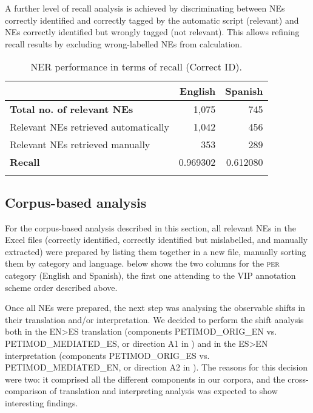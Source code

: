 \documentclass[output=paper]{langscibook}
\begin{document}
A further level of recall analysis is achieved by discriminating between NEs correctly identified and correctly tagged by the automatic script (relevant) and NEs correctly identified but wrongly tagged (not relevant). This allows refining recall results by excluding wrong-labelled NEs from calculation. 

\begin{table}
\begin{tabularx}{\textwidth}{Xrr} 
\lsptoprule
& {\bfseries English} & {\bfseries Spanish}\\
\midrule
{\bfseries Total no. of relevant NEs} & 1,075 & 745\\
Relevant NEs retrieved automatically & 1,042 & 456\\
Relevant NEs retrieved manually & 353 & 289\\
{\bfseries Recall} & 0.969302 & 0.612080\\
\lspbottomrule
\end{tabularx}
\caption{
NER performance in terms of recall (Correct ID).
}
\label{tab:corpas:7}
\end{table}


\subsection{Corpus-based analysis}\label{sec:corpas:4.3}

For the corpus-based analysis described in this section, all relevant NEs in the Excel files (correctly identified, correctly identified but mislabelled, and manually extracted) were prepared by listing them together in a new file, manually sorting them by category and language.   below shows the two columns for the \textsc{per} category (English and Spanish), the first one attending to the VIP annotation scheme order described above.

Once all NEs were prepared, the next step was analysing the observable shifts in their translation and/or interpretation. We decided to perform the shift analysis both in the EN>ES translation (components PETIMOD\_ORIG\_EN vs. PETIMOD\_MEDIATED\_ES, or direction A1 in ) and in the ES>EN interpretation (components PETIMOD\_ORIG\_ES vs. PETIMOD\_MEDIATED\_EN, or direction A2 in ). The reasons for this decision were two: it comprised all the different components in our corpora, and the cross-comparison of translation and interpreting analysis was expected to show interesting findings.
\end{document}
